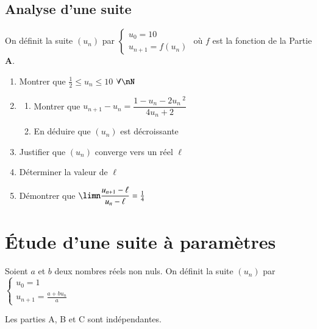 \documentclass[oneside,12pt]{article}
\let\oldsection\section
\renewcommand{\section}{\newpage\oldsection}
\begin{document}
\subsection{Analyse d'une suite}
On définit la suite $(u_n)$ par $\begin{cases}u_0=10\\u_{n+1}=f(u_n)\end{cases}$ où $f$ est la fonction de la Partie \textbf{A}.
\begin{enumerate}
    \item Montrer que $\frac{1}{2}\leq u_n\leq10$ \quad $\forall\nN$
    \item \begin{enumerate}
        \item Montrer que $u_{n+1}-u_n=\dfrac{1-u_n-2u_n\,^2}{4u_n+2}$
        \item En déduire que $(u_n)$ est décroissante
    \end{enumerate}
    \item Justifier que $(u_n)$ converge vers un réel $\ell$
    \item Déterminer la valeur de $\ell$
    \item Démontrer que $\limn\dfrac{u_{n+1}-\ell}{u_n-\ell}=\frac{1}{4}$
\end{enumerate}





\section{Étude d'une suite à paramètres}
Soient $a$ et $b$ deux nombres réels non nuls. On définit la suite $(u_n)$ par $\begin{cases}u_0=1\\u_{n+1}=\frac{a+bu_n}{a}\end{cases}$

Les parties A, B et C sont indépendantes.
\end{document}
